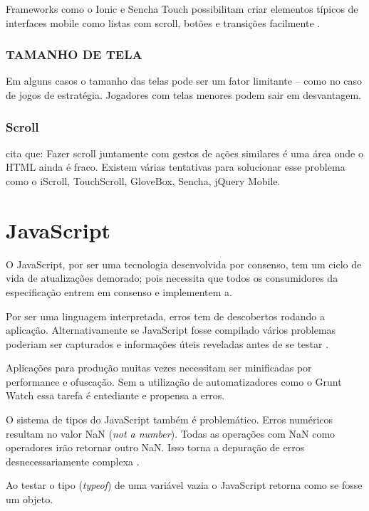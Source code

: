 Frameworks como o Ionic e Sencha Touch  possibilitam criar elementos
típicos de interfaces mobile como listas com scroll, botões e transições
facilmente \autocite{publishHtml5}.

\subsubsection{TAMANHO DE TELA}

Em alguns casos o tamanho das telas pode ser um fator limitante – como
no caso de jogos de estratégia. Jogadores com telas menores podem sair
em desvantagem.

\subsubsection{Scroll}

\autocite[pp. 9]{aSeriousContender} cita que:
Fazer scroll juntamente com gestos de ações similares é uma área
onde o HTML ainda é fraco. Existem várias tentativas para solucionar
esse problema como o iScroll, TouchScroll, GloveBox, Sencha, jQuery
Mobile.

\section{JavaScript}

O JavaScript, por ser uma tecnologia desenvolvida por consenso, tem um
ciclo de vida de atualizações demorado; pois necessita que todos os
consumidores da especificação entrem em consenso e implementem a.

Por ser uma linguagem interpretada, erros tem de descobertos rodando 
a aplicação. Alternativamente se JavaScript fosse compilado vários 
problemas poderiam ser capturados e informações úteis reveladas antes 
de se testar \autocite[pp. 12]{viabilityBusinessApplications}.

Aplicações para produção muitas vezes necessitam ser minificadas por performance
e ofuscação. Sem a utilização de automatizadores como o Grunt Watch essa tarefa 
é entediante e propensa a erros.

O sistema de tipos do JavaScript também é problemático.
Erros numéricos resultam no valor NaN (\textit{not a number}).
Todas as operações com NaN como operadores irão retornar outro
NaN. Isso torna a depuração de erros desnecessariamente complexa
\autocite{html5mostwanted}.

Ao testar o tipo (\textit{typeof}) de uma variável vazia o JavaScript retorna 
como se fosse um objeto.

